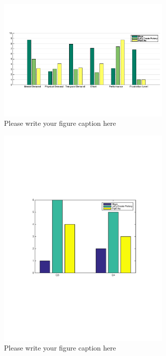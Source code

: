 \begin{figure}
  \includegraphics[width=0.75\textwidth]{f7.pdf}
\caption{Please write your figure caption here}
\label{fig:1}       %
\end{figure}

\begin{figure}
  \includegraphics[width=0.75\textwidth]{f8.pdf}
\caption{Please write your figure caption here}
\label{fig:1}       %
\end{figure}

